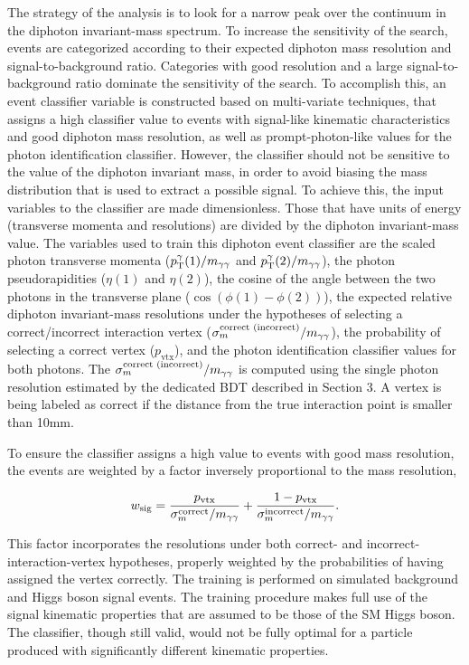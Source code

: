 \documentclass[12pt,twoside,a4paper,cmspaper,final,collab]{cms-tdr}
\begin{document}
The strategy of the analysis is to look for a narrow peak over the continuum in the diphoton invariant-mass
spectrum. To increase the sensitivity of the search, events are categorized according to their expected diphoton mass
resolution
and signal-to-background ratio. Categories with good
resolution and a large signal-to-background ratio dominate the sensitivity of the search.
To accomplish this, an event classifier variable is constructed based on multi-variate techniques, that assigns a high classifier value to events
with signal-like kinematic characteristics and good diphoton mass resolution, as well as
prompt-photon-like values for the photon identification classifier.
However, the classifier should not be sensitive to the value of the diphoton invariant mass, in order to avoid
biasing the mass distribution that is used to extract a possible signal.
To achieve this, the input variables to the classifier are made dimensionless.
Those that have units of energy (transverse momenta and resolutions) are divided by the diphoton invariant-mass value.
The variables used to train this diphoton event classifier are the scaled photon transverse momenta
($p_{\mathrm{T}}^{\gamma}(1)/m_{\gamma\gamma}$ and $p_{\mathrm{T}}^{\gamma}(2)/m_{\gamma\gamma}$), the photon pseudorapidities ($\eta(1)$ and $\eta(2)$),
the cosine of the angle between the two photons in the transverse plane ($\cos\left(\phi(1)-\phi(2)\right)$),
the expected relative diphoton invariant-mass resolutions under the hypotheses of selecting a correct/incorrect
interaction vertex ($\sigma_{m}^{\text{correct (incorrect)}}/m_{\gamma\gamma}$), the probability of selecting a correct vertex ($p_\text{vtx}$), and
the photon identification classifier values for both photons. The
$\sigma_{m}^{\text{correct (incorrect)}}/m_{\gamma\gamma}$ is computed using the
single photon resolution estimated by the dedicated BDT described in Section 3.
A vertex is being labeled as correct if the distance from the true
interaction point is smaller than 10\unit{mm}.

To ensure the classifier assigns a high  value to events with good mass resolution, the events
are weighted by a factor inversely proportional to the mass resolution,

\begin{equation}
w_\text{sig} = \frac{p_\text{vtx}}{\sigma_{m}^{\text{correct}}/m_{\gamma\gamma}} +
\frac{1-p_\text{vtx}}{\sigma_{m}^{\text{incorrect}}/m_{\gamma\gamma}}.
\end{equation}

This factor incorporates the resolutions under both correct- and incorrect-interaction-vertex
hypotheses, properly weighted by the probabilities of having assigned the vertex correctly. The training is
performed on simulated background and Higgs boson signal events. The training procedure makes full use 
of the signal kinematic properties that are assumed to be those of the SM Higgs boson.
The classifier, though still valid, would not be fully optimal for a particle produced with significantly 
different kinematic properties.
\end{document}

